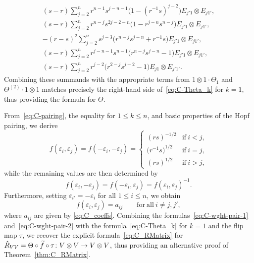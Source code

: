 \documentclass[10pt,a4paper]{amsart}
\numberwithin{equation}{section}
\begin{document}
\begin{gather*}
 (s - r)\sum_{j = 2}^{n}r^{n - 1}s^{j - n - 1}\bigl(1 - (r^{-1}s)^{j - 2}\bigr)E_{j'1} \otimes E_{j1'},
\\
 (s - r)\sum_{j = 2}^{n}r^{n - j}s^{2j - 2 - n}\bigl(1 - r^{j - n}s^{n- j}\bigr)E_{j'1} \otimes E_{j1'},
\\
 -(r - s)^{2}\sum_{j =2}^{n}s^{j - 3}\bigl(r^{n - j}s^{j - n} + r^{-1}s\bigr)E_{j'1} \otimes E_{j1'},
\\
 (s - r)\sum_{j = 2}^{n}r^{j - n - 1}s^{n - 1}\bigl(r^{n - j}s^{j - n} - 1\bigr)E_{j'1} \otimes E_{j1'},
\\
 (s - r)\sum_{j = 2}^{n}r^{j - 2}\bigl(r^{2 - j}s^{j - 2} - 1\bigr)E_{j1} \otimes E_{j'1'}.
\end{gather*}
Combining these summands with the appropriate terms from $1 \otimes 1 \cdot \Theta_{1}$ and $\Theta^{(2)}\cdot 1 \otimes 1$ matches precisely the right-hand side of~\eqref{eq:C-Theta_k} for $k=1$, thus providing the formula for $\Theta$.

From~\eqref{eq:C-pairing}, the equality   for $1\leq k\leq n$, and basic properties of the Hopf pairing, we derive
\begin{equation}\label{eq:C-wght-pair-1}
 f(\varepsilon_{i},\varepsilon_{j}) = f(-\varepsilon_{i},-\varepsilon_{j}) =
 \begin{cases}
 (rs)^{-1/2} & \text{if} \ i < j, \\
 \bigl(r^{-1}s\bigr)^{1/2} & \text{if}\ i = j, \\
 (rs)^{1/2} & \text{if}\ i > j,
 \end{cases}
\end{equation}
while the remaining values are then determined by
\begin{equation}\label{eq:C-wght-pair-2}
 f(\varepsilon_{i},-\varepsilon_{j}) = f(-\varepsilon_{i},\varepsilon_{j}) = f(\varepsilon_{i},\varepsilon_{j})^{-1}.
\end{equation}
Furthermore, setting $\varepsilon_{i'} = -\varepsilon_{i}$ for all $1 \le i \le n$, we obtain
\begin{equation}\label{eq:f_aij_CD}
 f(\varepsilon_{i},\varepsilon_{j}) = a_{ij} \qquad \mathrm{for\ all} \ i \neq j,j',
\end{equation}
where $a_{ij}$ are given by \eqref{eq:C_coeffs}. Combining the formulas~\eqref{eq:C-wght-pair-1} and~\eqref{eq:C-wght-pair-2} with the formula~\eqref{eq:C-Theta_k} for $k=1$ and the flip map $\tau$, we recover the explicit formula~\eqref{eq:C_RMatrix} for $\smash{\hat{R}_{VV}=\Theta \circ \widetilde{f}} \circ \tau\colon V \otimes V \to V \otimes V$, thus providing an alternative proof of Theorem~\ref{thm:C_RMatrix}.
\end{document}
